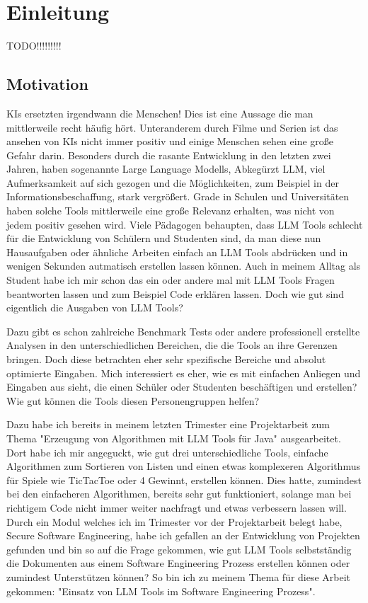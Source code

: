 
\chapter{Einleitung} 

TODO!!!!!!!!!

\section{Motivation}  \label{Motivation}

KIs ersetzten irgendwann die Menschen! Dies ist eine Aussage die man mittlerweile recht häufig hört. Unteranderem durch Filme und Serien ist das ansehen von KIs nicht 
immer positiv und einige Menschen sehen eine große Gefahr darin. Besonders durch die rasante Entwicklung in den letzten zwei Jahren, haben sogenannte Large Language Modells, Abkegürzt LLM, 
viel Aufmerksamkeit auf sich gezogen und die Möglichkeiten, zum Beispiel in der Informationsbeschaffung, stark vergrößert. Grade in Schulen und 
Universitäten haben solche Tools mittlerweile eine große Relevanz erhalten, was nicht von jedem positiv gesehen wird. Viele Pädagogen behaupten, dass LLM Tools 
schlecht für die Entwicklung von Schülern und Studenten sind, da man diese nun Hausaufgaben oder ähnliche Arbeiten einfach an LLM Tools abdrücken und in wenigen Sekunden 
autmatisch erstellen lassen können. Auch in meinem Alltag als Student habe ich mir schon das ein oder andere mal mit LLM Tools Fragen beantworten lassen und zum Beispiel 
Code erklären lassen. Doch wie gut sind eigentlich die Ausgaben von LLM Tools?

Dazu gibt es schon zahlreiche Benchmark Tests oder andere professionell erstellte Analysen in den unterschiedlichen Bereichen, die die Tools an ihre Gerenzen bringen.
Doch diese betrachten eher sehr spezifische Bereiche und absolut optimierte Eingaben. Mich interessiert es eher, wie es mit einfachen Anliegen und Eingaben aus
sieht, die einen Schüler oder Studenten beschäftigen und erstellen? Wie gut können die Tools diesen Personengruppen helfen?

Dazu habe ich bereits in meinem letzten Trimester eine Projektarbeit zum Thema "Erzeugung von Algorithmen mit LLM Tools für Java" ausgearbeitet. Dort habe ich mir 
angeguckt, wie gut drei unterschiedliche Tools, einfache Algorithmen zum Sortieren von Listen und einen etwas komplexeren Algorithmus für Spiele wie TicTacToe oder
4 Gewinnt, erstellen können. Dies hatte, zumindest bei den einfacheren Algorithmen, bereits sehr gut funktioniert, solange man bei richtigem Code nicht immer weiter nachfragt 
und etwas verbessern lassen will. Durch ein Modul welches ich im Trimester vor der Projektarbeit belegt habe, Secure Software Engineering, habe ich gefallen an der Entwicklung 
von Projekten gefunden und bin so auf die Frage gekommen, wie gut LLM Tools selbstständig die Dokumenten aus einem Software Engineering Prozess erstellen können oder zumindest 
Unterstützen können? So bin ich zu meinem Thema für diese Arbeit gekommen: "Einsatz von LLM Tools im Software Engineering Prozess".

